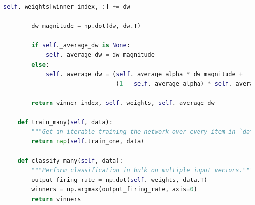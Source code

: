\documentclass[a4paper, 11pt, twocolumn, final]{article} %
\begin{document}
\begin{lstlisting}[language=Python, style=python]
        self._weights[winner_index, :] += dw

        dw_magnitude = np.dot(dw, dw.T)

        if self._average_dw is None:
            self._average_dw = dw_magnitude
        else:
            self._average_dw = (self._average_alpha * dw_magnitude +
                                (1 - self._average_alpha) * self._average_dw)

        return winner_index, self._weights, self._average_dw

    def train_many(self, data):
        """Get an iterable training the network over every item in `data`."""
        return map(self.train_one, data)

    def classify_many(self, data):
        """Perform classification in bulk on multiple input vectors."""
        output_firing_rate = np.dot(self._weights, data.T)
        winners = np.argmax(output_firing_rate, axis=0)
        return winners
\end{lstlisting}
\end{document}
